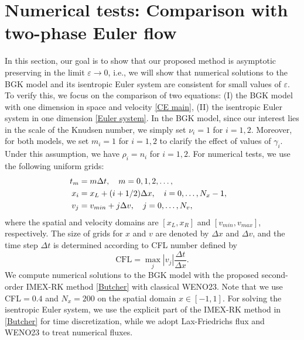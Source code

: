 \documentclass[10pt,reqno]{amsart}
\numberwithin{equation}{section}
\begin{document}
%
%
%
%
%
%
%
%
%
%
%
%
\section{Numerical tests: Comparison with two-phase Euler flow}\label{sec_numer2}
In this section, our goal is to show that our proposed method is asymptotic preserving in the limit $\varepsilon\to 0$, i.e.,  we will show that numerical solutions to the BGK model and its isentropic Euler system are consistent for small values of $\varepsilon$. To verify this, we focus on the comparison of two equations: (I) the BGK model with one dimension in space and velocity \eqref{CE main}, (II) the isentropic Euler system in one dimension \eqref{Euler system}. In the BGK model, since our interest lies in the scale of the Knudsen number, we simply set $\nu_i=1$ for $i=1,2$. Moreover, for both models, we set $m_i=1$ for $i=1,2$ to clarify the effect of values of $\gamma_i$. Under this assumption, we have $\rho_i=n_i$ for $i=1,2$. For numerical tests, we use the following uniform grids:
\begin{align*}
	t_m&=m\Delta t,\quad m=0,1,2,\dots,\cr
	x_i&=x_L + (i+1/2)\Delta x,\quad i=0,\dots,N_x-1,\cr 
	v_j&=v_{min}+j\Delta v,\quad j=0,\dots,N_v,
\end{align*}
where the spatial and velocity domains are $[x_L,x_R]$ and $[v_{min},v_{max}]$, respectively. The size of grids for $x$ and $v$ are denoted by $\Delta x$ and $\Delta v$, and the time step $\Delta t$ is determined according to CFL number defined by
$$\text{CFL}=\max_j |v_j|\frac{\Delta t}{\Delta x}.$$ 
We compute numerical solutions to the BGK model with the proposed second-order IMEX-RK method \eqref{Butcher} with classical WENO23. Note that we use CFL$=0.4$ and $N_x=200$ on the spatial domain $x\in [-1,1]$. For solving the isentropic Euler system, we use the explicit part of the IMEX-RK method in \eqref{Butcher} for time discretization, while we adopt Lax-Friedrichs flux and WENO23 to treat numerical fluxes.

%
%
%
%
%
%
%
%
%
%
%
%
\end{document}
